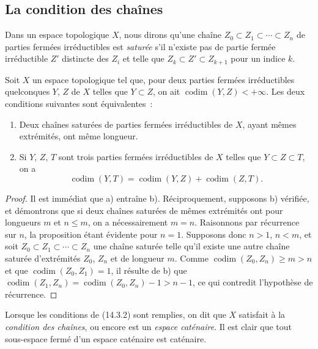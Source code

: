 \subsection{La condition des chaînes}
\label{subsection:0.14.3-fr}

\begin{env}[14.3.1]
\label{0.14.3.1-fr}
Dans un espace topologique $X$, nous dirons qu'une chaîne
$Z_0\subset Z_1\subset\cdots\subset Z_n$ de parties fermées irréductibles est
\emph{saturée} s'il n'existe pas de partie fermée irréductible $Z'$ distincte
des $Z_i$ et telle que $Z_k\subset Z'\subset Z_{k+1}$ pour un indice $k$.
\end{env}

\begin{proposition}[14.3.2]
\label{0.14.3.2-fr}
Soit $X$ un espace topologique tel que, pour deux parties fermées
irréductibles quelconques $Y$, $Z$ de $X$ telles que $Y\subset Z$, on ait
$\operatorname{codim}(Y,Z)<+\infty$. Les deux conditions suivantes sont
équivalentes~:
\begin{enumerate}
  \item[\rm(a)] Deux chaînes saturées de parties fermées irréductibles de $X$,
  ayant mêmes extrémités, ont même longueur.
  \item[\rm(b)] Si $Y$, $Z$, $T$ sont trois parties fermées irréductibles de
  $X$ telles que $Y\subset Z\subset T$, on a
  \[
    \operatorname{codim}(Y,T)=
    \operatorname{codim}(Y,Z)+\operatorname{codim}(Z,T).
    \tag{14.3.2.1}\label{0.14.3.2.1-fr}
  \]
\end{enumerate}
\end{proposition}

\begin{proof}
Il est immédiat que a) entraîne b). Réciproquement, supposons b) vérifiée, et
démontrons que si deux chaînes saturées de mêmes extrémités ont pour longueurs
$m$ et $n\leq m$, on a nécessairement $m=n$. Raisonnons par récurrence sur
$n$, la proposition étant évidente pour $n=1$. Supposons donc $n>1$, $n<m$,
et soit $Z_0\subset Z_1\subset\cdots\subset Z_n$ une
chaîne saturée telle qu'il existe une autre chaîne saturée d'extrémités
$Z_0$, $Z_n$ et de longueur $m$. Comme
$\operatorname{codim}(Z_0,Z_n)\geq m>n$ et que
$\operatorname{codim}(Z_0,Z_1)=1$, il résulte de b) que
$\operatorname{codim}(Z_1,Z_n)=\operatorname{codim}(Z_0,Z_n)-1>n-1$, ce qui
contredit l'hypothèse de récurrence.
\end{proof}

Lorsque les conditions de (14.3.2) sont remplies, on dit que $X$ satisfait à
la \emph{condition des chaînes}, ou encore est un \emph{espace caténaire}. Il
est clair que tout sous-espace fermé d'un espace caténaire est caténaire.

